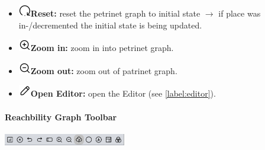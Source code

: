 \documentclass[10pt, a4paper]{article}
\begin{document}
\begin{itemize}
\item\includegraphics[scale=0.4]{../src/resources/images/Toolbar/restart.png}\hspace{0.1cm}\textbf{Reset:} reset the petrinet graph to initial state $\rightarrow$ if place was in-/decremented the initial state is being updated.
\item\includegraphics[scale=0.4]{../src/resources/images/Toolbar/zoom-in.png}\hspace{0.1cm}\textbf{Zoom in:} zoom in into petrinet graph.
\item\includegraphics[scale=0.4]{../src/resources/images/Toolbar/zoom-out.png}\hspace{0.1cm}\textbf{Zoom out:} zoom out of patrinet graph.
\item\includegraphics[scale=0.4]{../src/resources/images/Toolbar/edit.png}\hspace{0.1cm}\textbf{Open Editor:} open the Editor (see \ref{label:editor}).
\end{itemize}

\paragraph{Reachbility Graph Toolbar}

\includegraphics[height=0.5cm]{Viewer_Reachability_Toolbar.png}
\end{document}
